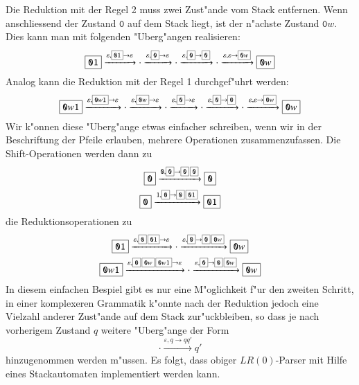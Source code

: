 Die Reduktion mit der Regel 2 muss zwei Zust"ande vom Stack entfernen.
Wenn anschliessend der Zustand $\boxed{\texttt{0}}$ auf dem Stack liegt, ist der
n"achste Zustand $\boxed{\texttt{0}w}$. Dies kann man mit folgenden "Uberg"angen
realisieren:
\[
\boxed{\texttt{01}}
\xrightarrow{\varepsilon,\scalebox{0.7}{\boxed{\texttt{01}}}\to\varepsilon}
\cdot
\xrightarrow{\varepsilon,\scalebox{0.7}{\boxed{\texttt{0}}}\to\varepsilon}
\cdot
\xrightarrow{\varepsilon,\scalebox{0.7}{\boxed{\texttt{0}}}\to\scalebox{0.7}{\boxed{\texttt{0}}}}
\cdot
\xrightarrow{\varepsilon,\varepsilon\to\scalebox{0.7}{\boxed{\texttt{0}w}}}
\boxed{\texttt{0}w}
\]
Analog kann die Reduktion mit der Regel 1 durchgef"uhrt werden:
\[
\boxed{\texttt{0}w\texttt{1}}
\xrightarrow{\varepsilon,\scalebox{0.7}{\boxed{\texttt{0}w\texttt{1}}}\to\varepsilon}
\cdot
\xrightarrow{\varepsilon,\scalebox{0.7}{\boxed{\texttt{0}w}}\to\varepsilon}
\cdot
\xrightarrow{\varepsilon,\scalebox{0.7}{\boxed{\texttt{0}}}\to\varepsilon}
\cdot
\xrightarrow{\varepsilon,\scalebox{0.7}{\boxed{\texttt{0}}}\to\scalebox{0.7}{\boxed{\texttt{0}}}}
\cdot
\xrightarrow{\varepsilon,\varepsilon\to\scalebox{0.7}{\boxed{\texttt{0}w}}}
\boxed{\texttt{0}w}
\]
Wir k"onnen diese "Uberg"ange etwas einfacher schreiben, wenn wir in der
Beschriftung der Pfeile erlauben, mehrere Operationen zusammenzufassen.
Die Shift-Ope\-rationen werden dann zu
\begin{gather*}
\boxed{\texttt{0}}\xrightarrow{\texttt{0},\scalebox{0.7}{\boxed{\texttt{0}}$\rightarrow$\boxed{\texttt{0}}\,\boxed{\texttt{0}}}}\boxed{\texttt{0}}
\\
\boxed{\texttt{0}}\xrightarrow{\texttt{1},\scalebox{0.7}{\boxed{\texttt{0}}$\rightarrow$\boxed{\texttt{0}}\,\boxed{\texttt{01}}}}\boxed{\texttt{01}}
\end{gather*}
die Reduktionsoperationen zu
\begin{gather*}
\boxed{\texttt{01}}
\xrightarrow{\varepsilon,\scalebox{0.7}{\boxed{\texttt{0}}\,\boxed{\texttt{01}}}\to\varepsilon}
\cdot
\xrightarrow{\varepsilon,\scalebox{0.7}{\boxed{\texttt{0}}}\to\scalebox{0.7}{\boxed{\texttt{0}}\,\boxed{\texttt{0}w}}}
\boxed{\texttt{0}w}
\\
\boxed{\texttt{0}w\texttt{1}}
\xrightarrow{\varepsilon,\scalebox{0.7}{\boxed{\texttt{0}}\,\boxed{\texttt{0}w}\,\boxed{\texttt{0}w\texttt{1}}}\to\varepsilon}
\cdot
\xrightarrow{\varepsilon,\scalebox{0.7}{\boxed{\texttt{0}}}\to\scalebox{0.7}{\boxed{\texttt{0}}\,\boxed{\texttt{0}w}}}
\boxed{\texttt{0}w}
\end{gather*}
In diesem einfachen Bespiel gibt es nur eine M"oglichkeit f"ur den zweiten
Schritt, in einer komplexeren Grammatik k"onnte nach der Reduktion jedoch
eine Vielzahl anderer Zust"ande auf dem Stack zur"uckbleiben, so dass je
nach vorherigem Zustand $q$ weitere "Uberg"ange der Form
\[
\cdot\xrightarrow{\varepsilon,q\to q q'}q'
\]
hinzugenommen werden m"ussen. Es folgt, dass obiger $LR(0)$-Parser mit
Hilfe eines Stackautomaten implementiert werden kann.

